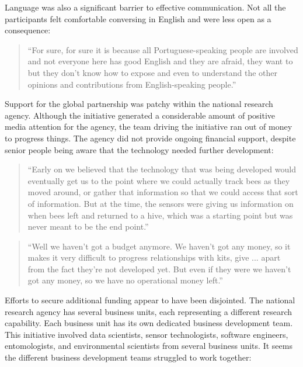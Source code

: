 Language was also a significant barrier to effective communication. Not all the participants felt comfortable conversing in English and were less open as a consequence:

\begin{quote}
\small
\enquote{For sure, for sure it is because all Portuguese-speaking people are involved and not everyone here has good English and they are afraid, they want to but they don't know how to expose and even to understand the other opinions and contributions from English-speaking people.} \\
\end{quote}

Support for the global partnership was patchy within the national research agency. Although the initiative generated a considerable amount of positive media attention for the agency, the team driving the initiative ran out of money to progress things. The agency did not provide ongoing financial support, despite senior people being aware that the technology needed further development:

\begin{quote}
\small
\enquote{Early on we believed that the technology that was being developed would eventually get us to the point where we could actually track bees as they moved around, or gather that information so that we could access that sort of information. But at the time, the sensors were giving us information on when bees left and returned to a hive, which was a starting point but was never meant to be the end point.} \\
\end{quote}

\begin{quote}
\small
\enquote{Well we haven't got a budget anymore.  We haven't got any money, so it makes it very difficult to progress relationships with kits, give ... apart from the fact they're not developed yet. But even if they were we haven't got any money, so we have no operational money left.} \\
\end{quote}

Efforts to secure additional funding appear to have been disjointed. The national research agency has several business units, each representing a different research capability. Each business unit has its own dedicated business development team. This initiative involved data scientists, sensor technologists, software engineers, entomologists, and environmental scientists from several business units. It seems the different business development teams struggled to work together:

